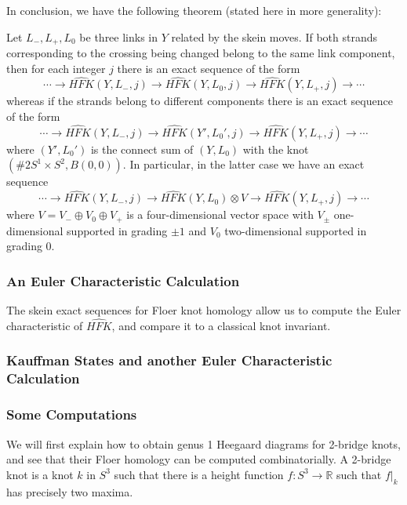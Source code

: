 In conclusion, we have the following theorem (stated here in more generality):
\begin{thm}
\label{Skein Exact Sequence}
Let $L_-,L_+,L_0$ be three links in $Y$ related by the skein moves. If both strands corresponding to the crossing being changed belong to the same link component, then for each integer $j$ there is an exact sequence of the form
\[ \cdots \longrightarrow \widehat{HFK}(Y,L_-,j) \longrightarrow \widehat{HFK}(Y,L_0,j) \longrightarrow \widehat{HFK}(Y,L_+,j) \longrightarrow \cdots \]
whereas if the strands belong to different components there is an exact sequence of the form
\[ \cdots \longrightarrow \widehat{HFK}(Y,L_-,j) \longrightarrow \widehat{HFK}(Y',L_0',j) \longrightarrow \widehat{HFK}(Y,L_+,j) \longrightarrow \cdots \]
where $(Y',L_0')$ is the connect sum of $(Y,L_0)$ with the knot $(\#2 S^1 \times S^2, B(0,0))$. In particular, in the latter case we have an exact sequence
\[ \cdots \longrightarrow \widehat{HFK}(Y,L_-,j) \longrightarrow \widehat{HFK}(Y,L_0) \otimes V \longrightarrow \widehat{HFK}(Y,L_+,j) \longrightarrow \cdots \]
where $V = V_- \oplus V_0 \oplus V_+$ is a four-dimensional vector space with $V_\pm$ one-dimensional supported in grading $\pm 1$ and $V_0$ two-dimensional supported in grading 0.
\end{thm}




\subsubsection{An Euler Characteristic Calculation}

The skein exact sequences for Floer knot homology allow us to compute the Euler characteristic of $\widehat{HFK}$, and compare it to a classical knot invariant. 




\subsubsection{Kauffman States and another Euler Characteristic Calculation}





\subsubsection{Some Computations}

We will first explain how to obtain genus 1 Heegaard diagrams for 2-bridge knots, and see that their Floer homology can be computed combinatorially. A 2-bridge knot is a knot $k$ in $S^3$ such that there is a height function $f : S^3 \rightarrow \mathbb R$ such that $f|_k$ has precisely two maxima. 

